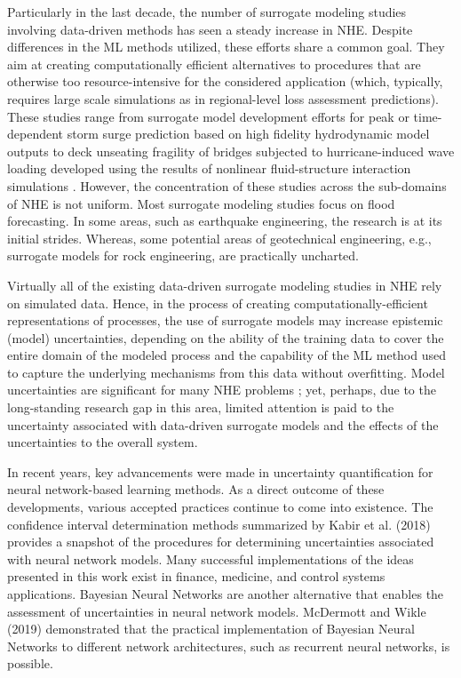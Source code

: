 Particularly in the last decade, the number of surrogate modeling studies involving data-driven methods has seen a steady increase in NHE. Despite differences in the ML methods utilized, these efforts share a common goal. They aim at creating computationally efficient alternatives to procedures that are otherwise too resource-intensive for the considered application (which, typically, requires large scale simulations as in regional-level loss assessment predictions). These studies range from surrogate model development efforts for peak or time-dependent storm surge prediction based on high fidelity hydrodynamic model outputs \citep{jia2016surrogate} to deck unseating fragility of bridges subjected to hurricane-induced wave loading developed using the results of nonlinear fluid-structure interaction simulations \citep{ataei2015fragility}. However, the concentration of these studies across the sub-domains of NHE is not uniform. Most surrogate modeling studies focus on flood forecasting. In some areas, such as earthquake engineering, the research is at its initial strides. Whereas, some potential areas of geotechnical engineering, e.g., surrogate models for rock engineering, are practically uncharted.

Virtually all of the existing data-driven surrogate modeling studies in NHE rely on simulated data. Hence, in the process of creating computationally-efficient representations of processes, the use of surrogate models may increase epistemic (model) uncertainties, depending on the ability of the training data to cover the entire domain of the modeled process and the capability of the ML method used to capture the underlying mechanisms from this data without overfitting. Model uncertainties are significant for many NHE problems \citep{gokkaya2016quantifying}; yet, perhaps, due to the long-standing research gap in this area, limited attention is paid to the uncertainty associated with data-driven surrogate models and the effects of the uncertainties to the overall system.

In recent years, key advancements were made in uncertainty quantification for neural network-based learning methods. As a direct outcome of these developments, various accepted practices continue to come into existence. The confidence interval determination methods summarized by Kabir et al. (2018) provides a snapshot of the procedures for determining uncertainties associated with neural network models. Many successful implementations of the ideas presented in this work exist in finance, medicine, and control systems applications. Bayesian Neural Networks \citep{blundell2015weight} are another alternative that enables the assessment of uncertainties in neural network models. McDermott and Wikle (2019) demonstrated that the practical implementation of Bayesian Neural Networks to different network architectures, such as recurrent neural networks, is possible. 

